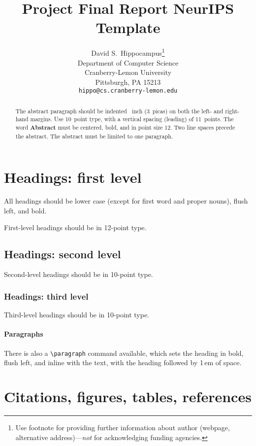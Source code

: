 \documentclass{article}
\title{Project Final Report NeurIPS Template}
\author{%
  David S.~Hippocampus\thanks{Use footnote for providing further information
    about author (webpage, alternative address)---\emph{not} for acknowledging
    funding agencies.} \\
  Department of Computer Science\\
  Cranberry-Lemon University\\
  Pittsburgh, PA 15213 \\
  \texttt{hippo@cs.cranberry-lemon.edu} \\
}
\begin{document}
\maketitle

\begin{abstract}
  The abstract paragraph should be indented ~inch (3~picas) on
  both the left- and right-hand margins. Use 10~point type, with a vertical
  spacing (leading) of 11~points.  The word \textbf{Abstract} must be centered,
  bold, and in point size 12. Two line spaces precede the abstract. The abstract
  must be limited to one paragraph.
\end{abstract}

\section{Headings: first level}
\label{headings}

All headings should be lower case (except for first word and proper nouns),
flush left, and bold.

First-level headings should be in 12-point type.

\subsection{Headings: second level}

Second-level headings should be in 10-point type.

\subsubsection{Headings: third level}

Third-level headings should be in 10-point type.

\paragraph{Paragraphs}

There is also a \verb+\paragraph+ command available, which sets the heading in
bold, flush left, and inline with the text, with the heading followed by 1\,em
of space.

\section{Citations, figures, tables, references}
\label{others}
\end{document}
